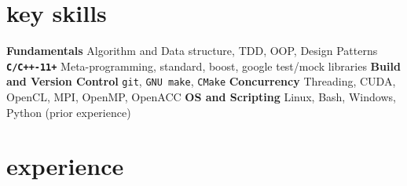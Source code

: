 \documentclass[]{twentysecondscv}
\begin{document}
\section{key skills}
\begin{twentyshort}
  \twentyitemshort
	{\small \textbf{Fundamentals}}
	{\small Algorithm and Data structure, TDD, OOP, Design Patterns}
  \twentyitemshort
    {\small \textbf{\texttt{C/C++-11+}}}
    {\small Meta-programming, standard,  boost, google test/mock libraries}
   \twentyitemshort
    {\small \textbf{Build and Version Control}}
    {\small  \texttt{git}, \texttt{GNU make}, \texttt{CMake}}
  \twentyitemshort
    {\small \textbf{Concurrency}}
    {\small  Threading, CUDA, OpenCL, MPI, OpenMP, OpenACC}
  \twentyitemshort
	{\small \textbf{OS and Scripting}}
	{\small  Linux, Bash, Windows, Python (prior experience)}
\end{twentyshort}



\section{experience}
\end{document}
